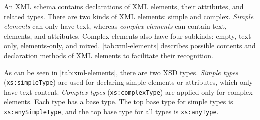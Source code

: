 An XML schema contains declarations of XML elements, their attributes, and related types.
There are two kinds of XML elements: simple and complex.
\emph{Simple elements} can only have text, whereas \emph{complex elements} can contain text, elements, and attributes.
Complex elements also have four subkinds: empty, text-only, elements-only, and mixed.
\autoref{tab:xml-elements} describes possible contents and declaration methods of XML elements to facilitate their recognition.






    
    


As can be seen in \autoref{tab:xml-elements}, there are two XSD types.
\emph{Simple types} (\texttt{xs:simpleType}) are used for declaring simple elements or attributes, which only have text content.
\emph{Complex types} (\texttt{xs:complexType}) are applied only for complex elements.
Each type has a base type.
The top base type for simple types is \texttt{xs:anySimpleType}, and the top base type for all types is \texttt{xs:anyType}.

